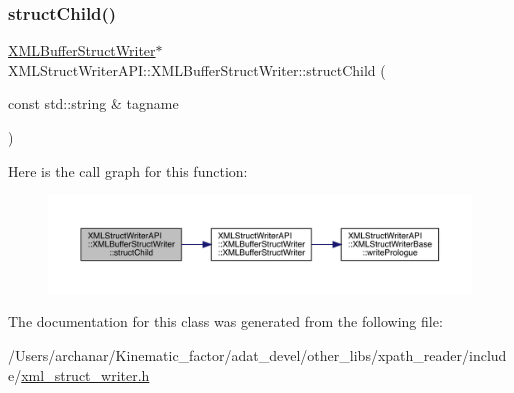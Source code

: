 \subsubsection{\texorpdfstring{structChild()}{structChild()}\hspace{0.1cm}{\footnotesize\ttfamily [2/2]}}
{\footnotesize\ttfamily \mbox{\hyperlink{classXMLStructWriterAPI_1_1XMLBufferStructWriter}{X\+M\+L\+Buffer\+Struct\+Writer}}$\ast$ X\+M\+L\+Struct\+Writer\+A\+P\+I\+::\+X\+M\+L\+Buffer\+Struct\+Writer\+::struct\+Child (\begin{DoxyParamCaption}\item[{const std\+::string \&}]{tagname }\end{DoxyParamCaption})\hspace{0.3cm}{\ttfamily [inline]}}

Here is the call graph for this function\+:
\nopagebreak
\begin{figure}[H]
\begin{center}
\leavevmode
\includegraphics[width=350pt]{d2/d0a/classXMLStructWriterAPI_1_1XMLBufferStructWriter_a1c5689221a56527dfd86ac071db3a534_cgraph}
\end{center}
\end{figure}


The documentation for this class was generated from the following file\+:\begin{DoxyCompactItemize}
\item 
/\+Users/archanar/\+Kinematic\+\_\+factor/adat\+\_\+devel/other\+\_\+libs/xpath\+\_\+reader/include/\mbox{\hyperlink{other__libs_2xpath__reader_2include_2xml__struct__writer_8h}{xml\+\_\+struct\+\_\+writer.\+h}}\end{DoxyCompactItemize}
